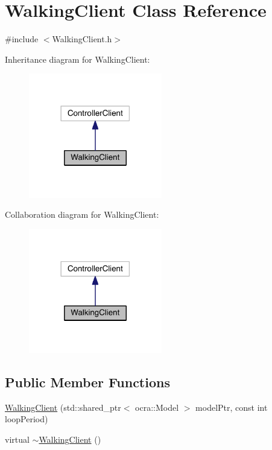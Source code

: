 \hypertarget{classWalkingClient}{}\section{Walking\+Client Class Reference}
\label{classWalkingClient}


{\ttfamily \#include $<$Walking\+Client.\+h$>$}



Inheritance diagram for Walking\+Client\+:
\nopagebreak
\begin{figure}[H]
\begin{center}
\leavevmode
\includegraphics[width=165pt]{classWalkingClient__inherit__graph}
\end{center}
\end{figure}


Collaboration diagram for Walking\+Client\+:
\nopagebreak
\begin{figure}[H]
\begin{center}
\leavevmode
\includegraphics[width=165pt]{classWalkingClient__coll__graph}
\end{center}
\end{figure}
\subsection*{Public Member Functions}
\begin{DoxyCompactItemize}
\item 
\hyperlink{classWalkingClient_a6c9002a44a54814c4b482739824e39aa}{Walking\+Client} (std\+::shared\+\_\+ptr$<$ ocra\+::\+Model $>$ model\+Ptr, const int loop\+Period)
\item 
virtual \hyperlink{classWalkingClient_a1dbc0308f844aea6542750104fddf8e2}{$\sim$\+Walking\+Client} ()
\end{DoxyCompactItemize}
